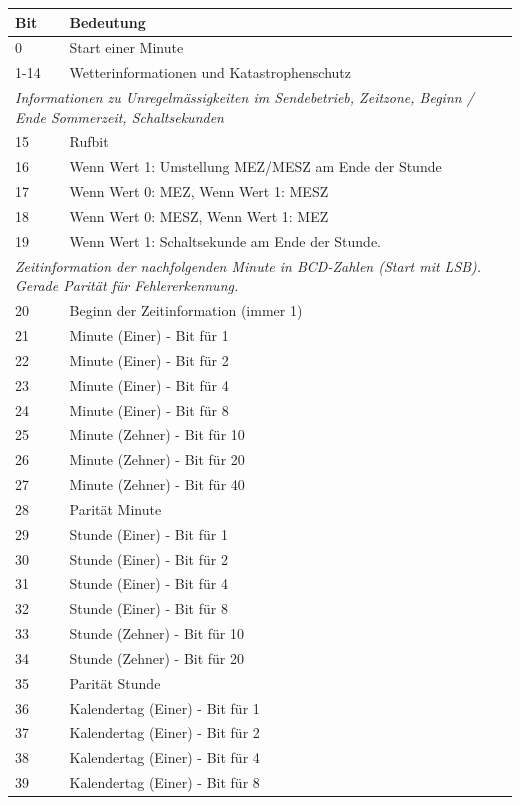 \begin{longtable}{p{0.5cm} p{13.5cm}}
\textbf{Bit} & \textbf{Bedeutung} \\ \hline \endhead
0 & Start einer Minute \\
1-14 & Wetterinformationen und Katastrophenschutz \\ \hline
\multicolumn{2}{p{14cm}}{\textit{Informationen zu Unregelmässigkeiten im Sendebetrieb, Zeitzone, Beginn / Ende Sommerzeit, Schaltsekunden}}  \\ \hline
15 & Rufbit \\
16 & Wenn Wert 1: Umstellung MEZ/MESZ am Ende der Stunde \\
17 & Wenn Wert 0: MEZ, Wenn Wert 1: MESZ \\
18 & Wenn Wert 0: MESZ, Wenn Wert 1: MEZ \\
19 & Wenn Wert 1: Schaltsekunde am Ende der Stunde. \\ \hline
\multicolumn{2}{p{14cm}}{\textit{Zeitinformation der nachfolgenden Minute in BCD-Zahlen (Start mit LSB). Gerade Parität für Fehlererkennung.}}  \\ \hline
20 & Beginn der Zeitinformation (immer 1) \\
21 & Minute (Einer) - Bit für 1 \\
22 & Minute (Einer) - Bit für 2 \\
23 & Minute (Einer) - Bit für 4 \\
24 & Minute (Einer) - Bit für 8 \\
25 & Minute (Zehner) - Bit für 10 \\
26 & Minute (Zehner) - Bit für 20 \\
27 & Minute (Zehner) - Bit für 40 \\
28 & Parität Minute \\ \hline
29 & Stunde (Einer) - Bit für 1 \\
30 & Stunde (Einer) - Bit für 2 \\
31 & Stunde (Einer) - Bit für 4 \\
32 & Stunde (Einer) - Bit für 8 \\
33 & Stunde (Zehner) - Bit für 10 \\
34 & Stunde (Zehner) - Bit für 20 \\
35 & Parität Stunde \\ \hline
36 & Kalendertag (Einer) - Bit für 1 \\
37 & Kalendertag (Einer) - Bit für 2 \\
38 & Kalendertag (Einer) - Bit für 4 \\
39 & Kalendertag (Einer) - Bit für 8 \\

\end{longtable}
